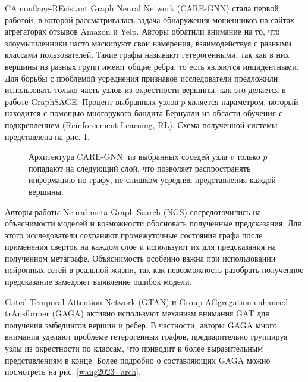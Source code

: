 CAmouflage-REsistant Graph Neural Network (CARE-GNN) \cite{dou2020} стала первой работой, в которой рассматривалась задача обнаружения мошенников на сайтах-агрегаторах отзывов Amazon и Yelp. Авторы обратили внимание на то, что злоумышленники часто маскируют свои намерения, взаимодействуя с разными классами пользователей. Такие графы называют гетерогенными, так как в них вершины из разных групп имеют общие ребра, то есть являются инцидентными. Для борьбы с проблемой усреднения признаков исследователи предложили использовать только часть узлов из окрестности вершины, как это делается в работе GraphSAGE. Процент выбранных узлов \(p\) является параметром, который находится с помощью многорукого бандита Бернулли из области обучения с подкреплением (Reinforcement Learning, RL). Схема полученной системы представлена на рис. \ref{dou2020_arch}.

\begin{figure}[ht]
\begin{center}
\caption{\label{dou2020_arch} Архитектура CARE-GNN: из выбранных соседей узла \(v\) только \(p\) попадают на следующий слой, что позволяет распространять информацию по графу, не слишком усредняя представления каждой вершины.}
\end {center}
\end {figure}

Авторы работы Neural meta-Graph Search (NGS) \cite{qin2022} сосредоточились на объяснимости моделей и возможности обосновать полученные предсказания. Для этого исследователи сохраняют промежуточные состояния графа после применения сверток на каждом слое и используют их для предсказания на полученном метаграфе. Объяснимость особенно важна при использовании нейронных сетей в реальной жизни, так как невозможность разобрать полученное предсказание замедляет выявление ошибок модели.

Gated Temporal Attention Network (GTAN) \cite{xiang2023} и Group AGgregation enhanced trAnsformer (GAGA) \cite{wang2023} активно используют механизм внимания GAT для получения эмбедингов вершин и ребер. В частности, авторы GAGA много внимания уделяют проблеме гетерогенных графов, предварительно группируя узлы из окрестности по классам, что приводит к более выразительным представлениям в конце. Более подробно о составляющих GAGA можно посмотреть на рис. \ref{wang2023_arch}.

